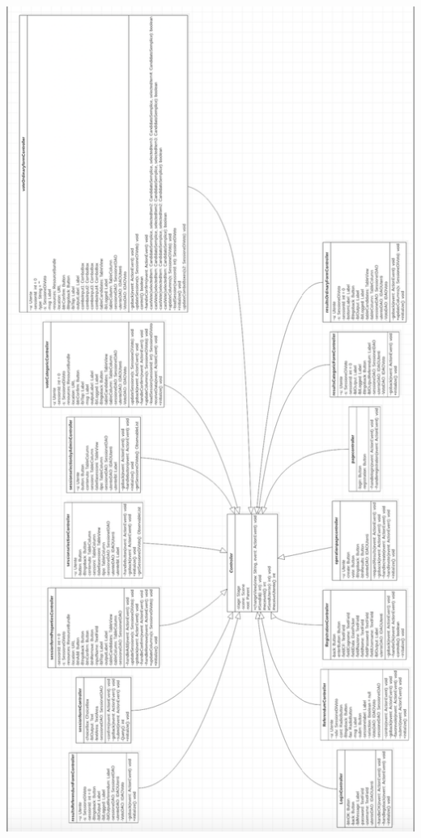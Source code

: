 \documentclass[11pt, oneside]{article}   	%
\begin{document}
    \begin{center}
    \includegraphics[scale=0.7]{images/class2.png}
    \end{center}

\pagebreak
\end{document}
